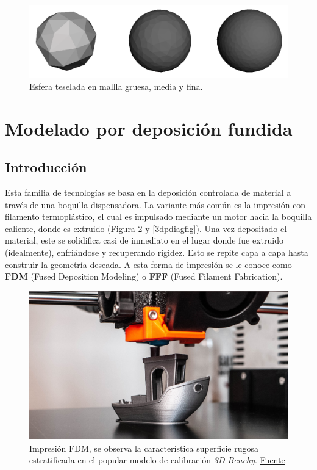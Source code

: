 \begin{figure}[h!]
	\centering
	\includegraphics[width=0.8\linewidth]{imgs/tesel.png}
	\caption{Esfera teselada en mallla gruesa, media y fina.}
	\label{stlfig}
\end{figure} 

\section{Modelado por deposición fundida}

\subsection{Introducción}

Esta familia de tecnologías se basa en la deposición controlada de material a través de una boquilla dispensadora. La variante más común es la impresión con filamento termoplástico, el cual es impulsado mediante un motor hacia la boquilla caliente, donde es extruido (Figura \ref{fdmpfig} y \ref{3dpdiagfig}). Una vez depositado el material, este se solidifica casi de inmediato en el lugar donde fue extruido (idealmente), enfriándose y recuperando rigidez. Esto se repite capa a capa hasta construir la geometría deseada. A esta forma de impresión se le conoce como \textbf{FDM} (Fused Deposition Modeling) o \textbf{FFF} (Fused Filament Fabrication).

\begin{figure}[h!]
	\centering
	\includegraphics[width=0.7\linewidth]{imgs/fdmp.png}
	\caption{Impresión FDM, se observa la característica superficie rugosa estratificada en el popular modelo de calibración \textit{3D Benchy}. \href{https://www.ultratec3d.ae/blogs/fdm-3d-printing-everything-you-need-to-know/}{Fuente}}
	\label{fdmpfig}
\end{figure} 


